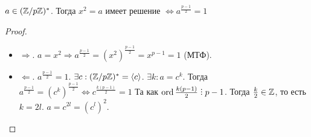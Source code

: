\begin{theorem}
    $a \in (\mathbb{Z} / p \mathbb{Z})^*$. Тогда  $x^2 = a$ имеет решение  $\iff a^{\frac{p-1}{2}} = 1$
\end{theorem}
\begin{proof}
    \slashn
    \begin{itemize}
        \item $\Rightarrow$.  $a = x^2 \Rightarrow a^{\frac{p-1}{2}} = (x^2)^{\frac{p-1}{2}} = x^{p-1} = 1$ (МТФ).
        \item $\Leftarrow$.  $a^{\frac{p-1}{2}} = 1$. $\exists c: (\mathbb{Z} / p \mathbb{Z})^* = \langle c \rangle$.  $\exists k: a = c^k$. Тогда  $a^{\frac{p-1}{2}} = (c^k)^{\frac{p-1}{2}} \iff c^{\frac{k(p-1)}{2}} = 1$ Та как $\ord \frac{k(p-1)}{2} \divby p - 1$. Тогда  $\frac{k}{2}\in \mathbb{Z}$, то есть $k = 2l$.  $a = c^{2l} = (c^l)^2$.
    \end{itemize}
\end{proof}
